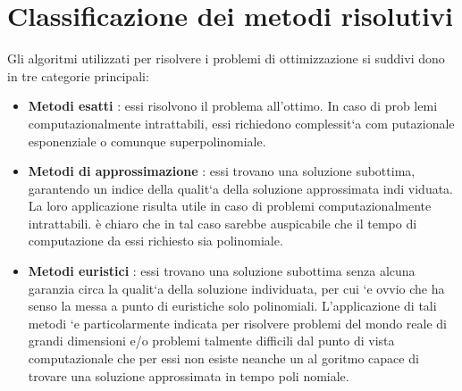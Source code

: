 \section{Classificazione dei metodi risolutivi}
Gli algoritmi utilizzati per risolvere i problemi di ottimizzazione si suddivi
dono in tre categorie principali:
\begin{itemize}
    \item \textbf{Metodi esatti} :  essi risolvono il problema all'ottimo. In caso di prob
lemi computazionalmente intrattabili, essi richiedono complessit`a com
putazionale esponenziale o comunque superpolinomiale.
    \item \textbf{Metodi di approssimazione} : essi trovano una soluzione subottima,
garantendo un indice della qualit`a della soluzione approssimata indi
viduata. La loro applicazione risulta utile in caso di problemi computazionalmente intrattabili. è chiaro che in tal caso sarebbe auspicabile che il tempo di computazione da essi richiesto sia polinomiale.
    \item \textbf{Metodi euristici} :  essi trovano una soluzione subottima senza alcuna
garanzia circa la qualit`a della soluzione individuata, per cui `e ovvio che
ha senso la messa a punto di euristiche solo polinomiali. L'applicazione
di tali metodi `e particolarmente indicata per risolvere problemi del
mondo reale di grandi dimensioni e/o problemi talmente difficili dal
punto di vista computazionale che per essi non esiste neanche un al
goritmo capace di trovare una soluzione approssimata in tempo poli
nomiale.


\end{itemize}